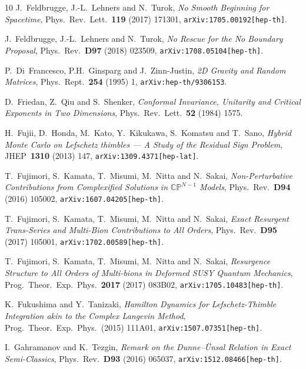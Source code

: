 \documentclass[11pt,a4paper]{article}
\def\BC{{\mathbb C}}
\def\BP{{\mathbb P}}
\begin{document}
\begin{thebibliography}{10}
J.~Feldbrugge, J.-L.~Lehners and N.~Turok,
\textit{No Smooth Beginning for Spacetime},
Phys.\ Rev.\ Lett.\ \textbf{119} (2017) 171301,
\texttt{arXiv:1705.00192[hep-th]}.

J.~Feldbrugge, J.-L.~Lehners and N.~Turok,
\textit{No Rescue for the No Boundary Proposal},
Phys.\ Rev.\ \textbf{D97} (2018) 023509,
\texttt{arXiv:1708.05104[hep-th]}.

P.~Di~Francesco, P.H.~Ginsparg and J.~Zinn-Justin,
\textit{2D Gravity and Random Matrices},
Phys.\ Rept.\ \textbf{254} (1995) 1,
\texttt{arXiv:hep-th/9306153}.

D.~Friedan, Z.~Qiu and S.~Shenker,
\textit{Conformal Invariance, Unitarity and Critical Exponents in Two Dimensions},
Phys.\ Rev.\ Lett.\ \textbf{52} (1984) 1575.

H.~Fujii, D.~Honda, M.~Kato, Y.~Kikukawa, S.~Komatsu and T.~Sano,
\textit{Hybrid Monte Carlo on Lefschetz thimbles --- A Study of the Residual Sign Problem},
JHEP\ \textbf{1310} (2013) 147,
\texttt{arXiv:1309.4371[hep-lat]}.

T.~Fujimori, S.~Kamata, T.~Misumi, M.~Nitta and N.~Sakai,
\textit{Non-Perturbative Contributions from Complexified Solutions in $\BC\BP^{N-1}$ Models},
Phys.\ Rev.\ \textbf{D94} (2016) 105002,
\texttt{arXiv:1607.04205[hep-th]}.

T.~Fujimori, S.~Kamata, T.~Misumi, M.~Nitta and N.~Sakai,
\textit{Exact Resurgent Trans-Series and Multi-Bion Contributions to All Orders},
Phys.\ Rev.\ \textbf{D95} (2017) 105001,
\texttt{arXiv:1702.00589[hep-th]}.

T.~Fujimori, S.~Kamata, T.~Misumi, M.~Nitta and N.~Sakai,
\textit{Resurgence Structure to All Orders of Multi-bions in Deformed SUSY Quantum Mechanics},
Prog.\ Theor.\ Exp.\ Phys.\ \textbf{2017} (2017) 083B02,
\texttt{arXiv:1705.10483[hep-th]}.

K.~Fukushima and Y.~Tanizaki,
\textit{Hamilton Dynamics for Lefschetz-Thimble Integration akin to the Complex Langevin Method},
Prog.\ Theor.\ Exp.\ Phys.\ (2015) 111A01,
\texttt{arXiv:1507.07351[hep-th]}.

I.~Gahramanov and K.~Tezgin,
\textit{Remark on the Dunne--\"Unsal Relation in Exact Semi-Classics},
Phys.\ Rev.\ \textbf{D93} (2016) 065037,
\texttt{arXiv:1512.08466[hep-th]}.


\end{thebibliography}
\end{document}
